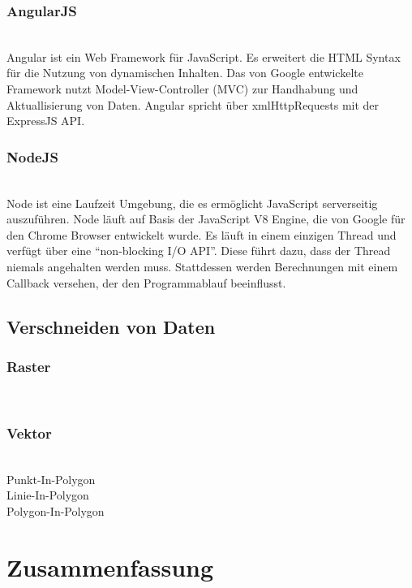 \documentclass[10pt,conference,compsocconf]{IEEEtran}
\begin{document}
\subsubsection{AngularJS}\hspace*{\fill} \\
Angular ist ein Web Framework für JavaScript. Es erweitert die HTML Syntax für die Nutzung von dynamischen Inhalten. Das von Google entwickelte Framework nutzt Model-View-Controller (MVC) zur Handhabung und Aktuallisierung von Daten. Angular spricht über xmlHttpRequests mit der ExpressJS API.\vspace{.5em}

\subsubsection{NodeJS}\hspace*{\fill} \\
Node ist eine Laufzeit Umgebung, die es ermöglicht JavaScript serverseitig auszuführen. Node läuft auf Basis der JavaScript V8 Engine, die von Google für den Chrome Browser entwickelt wurde. Es läuft in einem einzigen Thread und verfügt über eine \enquote{non-blocking I/O API}. Diese führt dazu, dass der Thread niemals angehalten werden muss. Stattdessen werden Berechnungen mit einem Callback versehen, der den Programmablauf beeinflusst.

\subsection{Verschneiden von Daten}

\subsubsection{Raster}\hspace*{\fill} \\


\subsubsection{Vektor}\hspace*{\fill} \\
Punkt-In-Polygon\\

Linie-In-Polygon\\

Polygon-In-Polygon


\section{Zusammenfassung}





\end{document}
